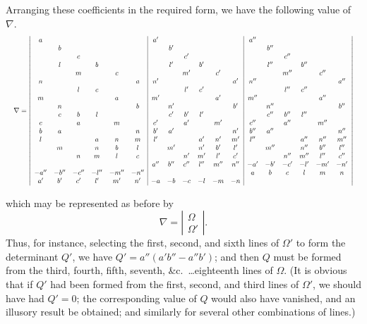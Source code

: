 \documentclass[11pt]{article}
\begin{document}
Arranging these coefficients in the required form, we have the following value of $\nabla$.
\begingroup
\setlength{\arraycolsep}{3.2pt}
\renewcommand{\arraystretch}{1.15}
\[
\resizebox{\textwidth}{!}{$
\nabla =
\left|
\begin{array}{cccccc|cccccc|cccccc}
a & & & & & & a' & & & & & & a'' & & & & &\\
 & b & & & & & & b' & & & & & & b'' & & & &\\
 & & c & & & & & & c' & & & & & & c'' & & &\\
 & l & & b & & & & l' & & b' & & & & l'' & & b'' & &\\
 & & m & & c & & & & m' & & c' & & & & m'' & & c'' &\\
n & & & & & a & n' & & & & & a' & n'' & & & & & a''\\
 & & l & c & & & & & l' & c' & & & & & l'' & c'' & &\\
m & & & & a & & m' & & & & a' & & m'' & & & & a'' &\\
 & n & & & & b & & n' & & & & b' & & n'' & & & & b''\\
 & c & b & l & & & & c' & b' & l' & & & & c'' & b'' & l'' & &\\
c & & a & & m & & c' & & a' & & m' & & c'' & & a'' & & m'' &\\
b & a & & & & n & b' & a' & & & & n' & b'' & a'' & & & & n''\\
l & & & a & n & m & l' & & & a' & n' & m' & l'' & & & a'' & n'' & m''\\
 & m & & n & b & l & & m' & & n' & b' & l' & & m'' & & n'' & b'' & l''\\
 & & n & m & l & c & & & n' & m' & l' & c' & & & n'' & m'' & l'' & c''\\
 & & & & & & a'' & b'' & c'' & l'' & m'' & n'' & -a' & -b' & -c' & -l' & -m' & -n'\\
-a'' & -b'' & -c'' & -l'' & -m'' & -n'' & & & & & & & a & b & c & l & m & n\\
a' & b' & c' & l' & m' & n' & -a & -b & -c & -l & -m & -n & & & & & &
\end{array}
\right|
$}
\]
\endgroup

\bigskip

\noindent which may be represented as before by
\[
\nabla =
\left|
\begin{array}{c}
\Omega\\ \hline
\Omega'
\end{array}
\right|.
\]
Thus, for instance, selecting the first, second, and sixth lines of $\Omega'$ to form the
determinant $Q'$, we have $Q' = a''(a'b'' - a''b')$; and then $Q$ must be formed from the
third, fourth, fifth, seventh, \&c.\ \ldots eighteenth lines of $\Omega$. (It is obvious that if $Q'$ had
been formed from the first, second, and third lines of $\Omega'$, we should have had $Q' = 0$;
the corresponding value of $Q$ would also have vanished, and an illusory result be
obtained; and similarly for several other combinations of lines.)
\end{document}
